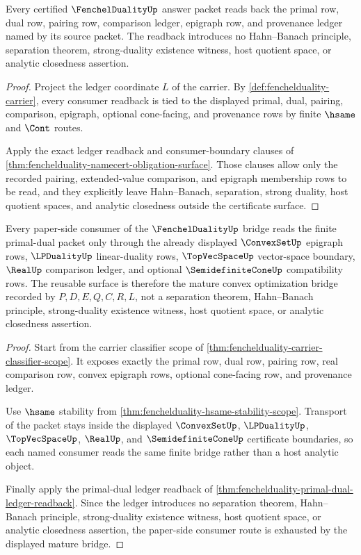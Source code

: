 \begin{theorem}
\label{thm:fenchelduality-primal-dual-ledger-readback}
Every certified $\FenchelDualityUp$ answer packet reads back the primal row,
dual row, pairing row, comparison ledger, epigraph row, and provenance ledger
named by its source packet. The readback introduces no Hahn--Banach principle,
separation theorem, strong-duality existence witness, host quotient space, or
analytic closedness assertion.
\end{theorem}
\begin{proof}
Project the ledger coordinate $L$ of the carrier. By
\autoref{def:fenchelduality-carrier}, every consumer readback is tied to the
displayed primal, dual, pairing, comparison, epigraph, optional cone-facing,
and provenance rows by finite $\hsame$ and $\Cont$ routes.

Apply the exact ledger readback and consumer-boundary clauses of
\autoref{thm:fenchelduality-namecert-obligation-surface}. Those clauses allow
only the recorded pairing, extended-value comparison, and epigraph membership
rows to be read, and they explicitly leave Hahn--Banach, separation, strong
duality, host quotient spaces, and analytic closedness outside the certificate
surface.
\end{proof}

\begin{theorem}
\label{thm:fenchelduality-mature-consumer-route}
Every paper-side consumer of the $\FenchelDualityUp$ bridge reads the finite
primal-dual packet only through the already displayed $\ConvexSetUp$ epigraph
rows, $\LPDualityUp$ linear-duality rows, $\TopVecSpaceUp$ vector-space
boundary, $\RealUp$ comparison ledger, and optional $\SemidefiniteConeUp$
compatibility rows. The reusable surface is therefore the mature convex
optimization bridge recorded by $P,D,E,Q,C,R,L$, not a separation theorem,
Hahn--Banach principle, strong-duality existence witness, host quotient space,
or analytic closedness assertion.
\end{theorem}
\begin{proof}
Start from the carrier classifier scope of
\autoref{thm:fenchelduality-carrier-classifier-scope}. It exposes exactly the
primal row, dual row, pairing row, real comparison row, convex epigraph rows,
optional cone-facing row, and provenance ledger.

Use $\hsame$ stability from
\autoref{thm:fenchelduality-hsame-stability-scope}. Transport of the packet
stays inside the displayed $\ConvexSetUp$, $\LPDualityUp$, $\TopVecSpaceUp$,
$\RealUp$, and $\SemidefiniteConeUp$ certificate boundaries, so each named
consumer reads the same finite bridge rather than a host analytic object.

Finally apply the primal-dual ledger readback of
\autoref{thm:fenchelduality-primal-dual-ledger-readback}. Since the ledger
introduces no separation theorem, Hahn--Banach principle, strong-duality
existence witness, host quotient space, or analytic closedness assertion, the
paper-side consumer route is exhausted by the displayed mature bridge.
\end{proof}

